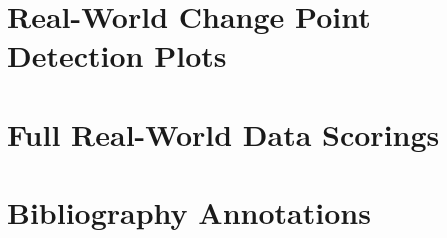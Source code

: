 \documentclass{uvamscse}	%
\begin{document}



\chapter{Real-World Change Point Detection Plots}
\label{changeplots}




\chapter{Full Real-World Data Scorings}
\label{fullscores}




\chapter{Bibliography Annotations}

\end{document}
